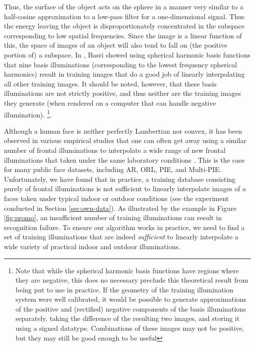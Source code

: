 Thus, the surface of the object acts on the sphere in a manner very similar to a half-cosine approximation to a low-pass filter for a one-dimensional signal.  Thus the energy leaving the object is disproportionately concentrated in the subspace corresponding to low spatial frequencies.  Since the image is a linear function of this, the space of images of an object will also tend to fall on (the positive portion of) a subspace.   In \cite{Basri2003-PAMI}, Basri showed using spherical harmonic basis functions that nine basis illuminations (corresponding to the lowest frequency spherical harmonics) result in training images that do a good job of linearly interpolating all other training images.  It should be noted, however, that these basis illuminations are not strictly positive, and thus neither are the training images they generate (when rendered on a computer that can handle negative illumination).  \footnote{Note that while the spherical harmonic basis functions have regions where they are negative, this does no necessary preclude this theoretical result from being put to use in practice.  If the geometry of the training illumination system were well calibrated, it would be possible to generate approximations of the positive and (rectified) negative components of the basis illuminations separately, taking the difference of the resulting two images, and storing it using a signed datatype.  Combinations of these images may not be positive, but they may still be good enough to be useful}.

Although a human face is neither perfectly Lambertian nor convex, it has been observed in various empirical studies that one can often get away using a similar number of frontal illuminations to interpolate a wide range of new frontal illuminations that taken under the same laboratory conditions \cite{Georghiades2001-PAMI}. This is the case for many public face datasets, including AR, ORL, PIE, and Multi-PIE.  Unfortunately, we have found that in practice, a training database consisting purely of frontal illuminations is not sufficient to linearly interpolate images of a faces taken under typical indoor or outdoor conditions (see the experiment conducted in Section \ref{sec:own-data}). As illustrated by the example in Figure \ref{fig:promo}, an insufficient number of training illuminations can result in recognition failure. 
To ensure our algorithm works in practice, we need to find a set of training illuminations that are indeed {\em sufficient} to linearly interpolate a wide variety of practical indoor and outdoor illuminations.\vspace{0mm}

